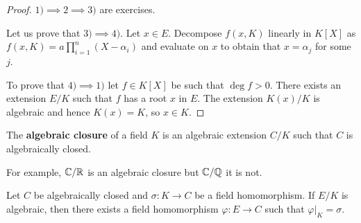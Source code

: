 \begin{proof}
	$1)\implies 2\implies 3)$ are exercises.  
	
	Let us prove that $3)\implies
	4)$. Let $x\in E$. Decompose $f(x,K)$ linearly in $K[X]$ as
	$f(x,K)=a\prod_{i=1}^n(X-\alpha_i)$ and evaluate on $x$ to obtain that
	$x=\alpha_j$ for some $j$. 
	
	To prove that $4)\implies 1)$ let $f\in K[X]$ be
	such that $\deg f>0$. There exists an extension $E/K$ such that $f$ has a
	root $x$ in $E$. The extension $K(x)/K$ is algebraic and hence $K(x)=K$, so
	$x\in K$. 
\end{proof}




\begin{definition}
	The \textbf{algebraic closure} of a field $K$ is an algebraic extension $C/K$ 
	such that $C$ is algebraically closed. 
\end{definition}

For example, $\mathbb{C}/\mathbb{R}$ is an algebraic closure but $\mathbb{C}/\mathbb{Q}$ it is not. 

\begin{proposition}
\label{pro:Artin}
	Let $C$ be algebraically closed and $\sigma\colon K\to C$ be a field homomorphism. If $E/K$ 
	is algebraic, then there exists a field homomorphism 
	$\varphi\colon E\to C$ such that 
	$\varphi|_K=\sigma$. 
\end{proposition}

